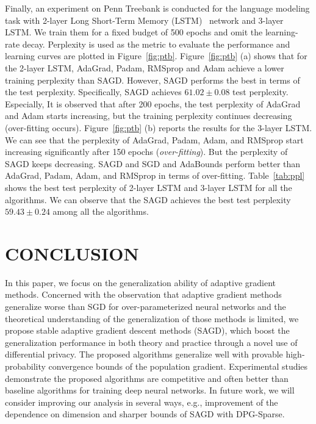 \documentclass[11pt]{article}
\begin{document}
Finally, an experiment on Penn Treebank is conducted for the language modeling task with 2-layer Long Short-Term Memory (LSTM)~\citep{stni2018} network and 3-layer LSTM. We train them for a fixed budget of 500 epochs and omit the learning-rate decay. Perplexity is used as the metric to evaluate the performance and learning curves are plotted in Figure~\ref{fig:ptb}. 
Figure~\ref{fig:ptb} (a) shows that for the 2-layer LSTM, AdaGrad, Padam, RMSprop and Adam achieve a lower training perplexity than SAGD. However, SAGD performs the best in terms of the test perplexity. Specifically, SAGD achieves $61.02 \pm 0.08$ test perplexity. 
Especially, It is observed that after 200 epochs, the test perplexity of AdaGrad and Adam starts increasing, but the training perplexity continues decreasing (over-fitting occurs).  
Figure~\ref{fig:ptb} (b) reports the results for the 3-layer LSTM. We can see that the perplexity of AdaGrad, Padam, Adam, and RMSprop start increasing significantly after 150 epochs (\emph{over-fitting}). But the perplexity of SAGD keeps decreasing. SAGD and
SGD and AdaBounds perform better than AdaGrad, Padam, Adam, and RMSprop in terms of over-fitting.
Table~\ref{tab:ppl} shows the best test perplexity of 2-layer LSTM and 3-layer LSTM for all the algorithms. We can observe that the SAGD achieves the best test perplexity $59.43 \pm 0.24$ among all the algorithms. 

\section{CONCLUSION}
\label{sec: conclusion}
In this paper, we focus on the generalization ability of adaptive gradient methods. Concerned with the 
observation that adaptive gradient methods generalize worse than SGD for over-parameterized neural networks and the theoretical understanding of the generalization of those methods is limited,
we propose stable adaptive gradient descent methods (SAGD), which boost the generalization performance in both theory and practice through a novel use of differential privacy. The proposed algorithms generalize well with provable high-probability convergence bounds of the population gradient. Experimental studies demonstrate the proposed algorithms are competitive and often better than baseline algorithms for training deep neural networks. 
In future work, we will consider improving our analysis in several ways, e.g.,  improvement of the dependence on dimension and sharper bounds of SAGD with DPG-Sparse.



\clearpage




\clearpage


\appendix


\end{document}

